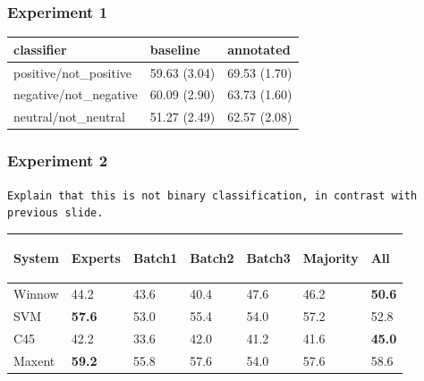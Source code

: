 \documentclass[10pt]{beamer}
\begin{document}
\begin{frame}
  \frametitle{Experiment 1}

\begin{center}
\begin{tabular}{|l|l|l|}
\hline
classifier &baseline &annotated \\ 
\hline
positive/not\_positive &59.63 (3.04) &69.53 (1.70) \\ 
\hline
negative/not\_negative &60.09 (2.90) &63.73 (1.60) \\ 
\hline
neutral/not\_neutral &51.27 (2.49) &62.57 (2.08) \\ 
\hline
\end{tabular}
\end{center}

\end{frame}

\begin{frame}
  \frametitle{Experiment 2}

\texttt{Explain that this is not binary classification, in contrast with previous slide.}

\begin{center}
\begin{small}
\begin{tabular}{|l|l|l|l|l|l|l|} \hline
 System & 
 {\begin{sideways}\parbox{2cm}{\centering Experts}\end{sideways}} &
 {\begin{sideways}\parbox{2cm}{\centering Batch1}\end{sideways}} &
 {\begin{sideways}\parbox{2cm}{\centering Batch2}\end{sideways}} &
 {\begin{sideways}\parbox{2cm}{\centering Batch3}\end{sideways}} &
 {\begin{sideways}\parbox{2cm}{\centering Majority}\end{sideways}} &
 {\begin{sideways}\parbox{2cm}{\centering All}\end{sideways}} \\ \hline
 Winnow & 44.2 & 43.6 & 40.4 & 47.6 & 46.2 & \textbf{50.6} \\ \hline
 SVM & \textbf{57.6} & 53.0 & 55.4 & 54.0 & 57.2 & 52.8 \\ \hline
 C45 & 42.2 & 33.6 & 42.0 & 41.2 & 41.6 & \textbf{45.0} \\ \hline
 Maxent & \textbf{59.2} & 55.8 & 57.6 & 54.0 & 57.6 & 58.6 \\ \hline
\end{tabular}
\end{small}
\end{center}
\end{frame}
\end{document}
